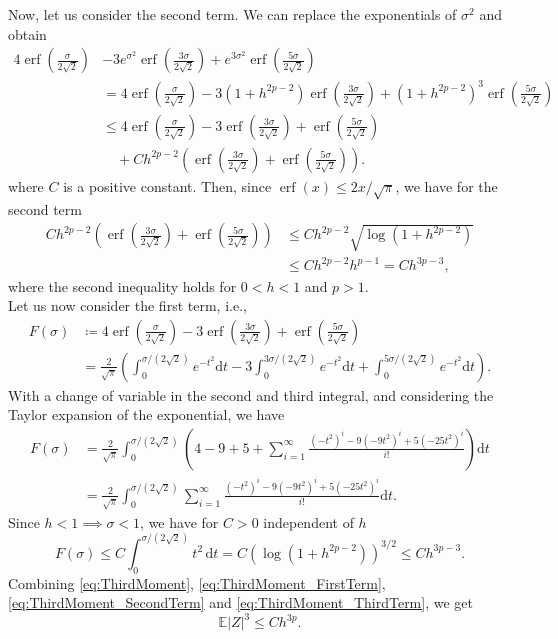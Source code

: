 \documentclass{scrartcl}
\theoremstyle{definition}
\theoremstyle{plain}
\newcommand{\erf}{\operatorname{erf}}
\newcommand{\E}{\mathbb{E}}
\newcommand{\dd}{\mathrm{d}}
\newcommand{\defeq}{\coloneqq}
\begin{document}
	Now, let us consider the second term. We can replace the exponentials of $\sigma^2$ and obtain
	\begin{align*}
		4\erf\left(\frac{\sigma}{2\sqrt{2}}\right)
		&-3e^{\sigma^2}\erf\left(\frac{3\sigma}{2\sqrt{2}}\right)+e^{3\sigma^2}\erf\left(\frac{5\sigma}{2\sqrt{2}}\right)\\ 
		&= 4\erf\left(\frac{\sigma}{2\sqrt{2}}\right) -3\left(1+h^{2p-2}\right)\erf\left(\frac{3\sigma}{2\sqrt{2}}\right)+\left(1+h^{2p-2}\right)^3\erf\left(\frac{5\sigma}{2\sqrt{2}}\right)\\
		&\leq 4\erf\left(\frac{\sigma}{2\sqrt{2}}\right) -3\erf\left(\frac{3\sigma}{2\sqrt{2}}\right) + \erf\left(\frac{5\sigma}{2\sqrt{2}}\right) \\
			&\quad +Ch^{2p-2}\left(\erf\left(\frac{3\sigma}{2\sqrt{2}}\right) + \erf\left(\frac{5\sigma}{2\sqrt{2}}\right)\right).
	\end{align*}
	where $C $ is a positive constant. Then, since $\erf(x) \leq 2x/\sqrt\pi$, we have for the second term
	\begin{equation}\label{eq:ThirdMoment_SecondTerm}
	\begin{aligned}
		Ch^{2p-2}\left(\erf\left(\frac{3\sigma}{2\sqrt{2}}\right) + \erf\left(\frac{5\sigma}{2\sqrt{2}}\right)\right) &\leq C h^{2p-2}\sqrt{\log(1+h^{2p-2})} \\
		&\leq Ch^{2p-2}h^{p-1} = Ch^{3p-3},
	\end{aligned}
	\end{equation}
	where the second inequality holds for $0 < h < 1$ and $p > 1$. \\
	Let us now consider the first term, i.e.,
	\begin{align*}
		F(\sigma) &\defeq 4\erf\left(\frac{\sigma}{2\sqrt{2}}\right) -3\erf\left(\frac{3\sigma}{2\sqrt{2}}\right) + \erf\left(\frac{5\sigma}{2\sqrt{2}}\right) \\
		&= \frac{2}{\sqrt{\pi}}\left( \int_{0}^{\sigma/(2\sqrt 2)} e^{-t^2} \dd t - 3 \int_{0}^{3\sigma/(2\sqrt 2)} e^{-t^2} \dd t + \int_{0}^{5\sigma/(2\sqrt 2)} e^{-t^2} \dd t \right).
	\end{align*}
	With a change of variable in the second and third integral, and considering the Taylor expansion of the exponential, we have
	\begin{align*}
		F(\sigma) &= \frac{2}{\sqrt{\pi}} \int_{0}^{\sigma/(2\sqrt 2)} \left(4 - 9 + 5 + \sum_{i=1}^{\infty}\frac{(-t^2)^i -9(-9t^2)^i+5(-25t^2)^i}{i!}\right) \dd t \\
		&= \frac{2}{\sqrt{\pi}}\int_{0}^{\sigma/(2\sqrt 2)} \sum_{i=1}^{\infty}\frac{(-t^2)^i -9(-9t^2)^i+5(-25t^2)^i}{i!} \dd t.
	\end{align*}
	Since $h < 1 \implies \sigma < 1$, we have for $C > 0$ independent of $h$
	\begin{equation}\label{eq:ThirdMoment_ThirdTerm}
		F(\sigma) \leq C \int_{0}^{\sigma/(2\sqrt 2)} t^2 \, \dd t = C \left(\log(1+h^{2p-2})\right)^{3/2} \leq Ch^{3p-3}.
	\end{equation}
	Combining \eqref{eq:ThirdMoment}, \eqref{eq:ThirdMoment_FirstTerm}, \eqref{eq:ThirdMoment_SecondTerm} and \eqref{eq:ThirdMoment_ThirdTerm}, we get
	\begin{equation*}
		\E|Z|^3 \leq Ch^{3p}.
	\end{equation*}
\end{document}
